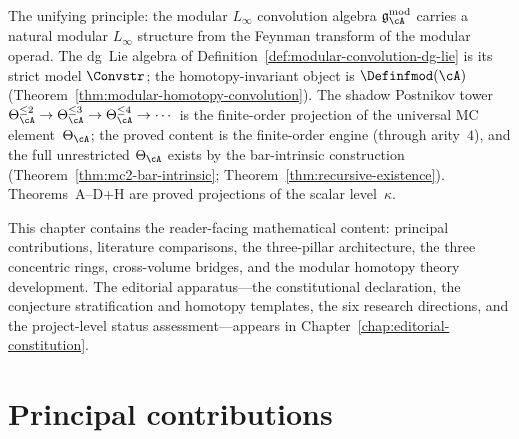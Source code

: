 \noindent
The unifying principle: the modular $L_\infty$ convolution algebra
$\mathfrak{g}^{\mathrm{mod}}_\cA$ carries a natural modular $L_\infty$
structure from the Feynman transform of the modular operad.  The dg~Lie
algebra of Definition~\ref{def:modular-convolution-dg-lie} is its strict
model $\Convstr$; the homotopy-invariant object is $\Definfmod(\cA)$
(Theorem~\ref{thm:modular-homotopy-convolution}).  The shadow Postnikov tower
$\Theta_\cA^{\le 2} \to \Theta_\cA^{\le 3} \to \Theta_\cA^{\le 4}
\to \cdots$ is the finite-order projection of the universal MC
element~$\Theta_\cA$; the proved content is the finite-order engine
(through arity~$4$), and the full unrestricted $\Theta_\cA$ exists
by the bar-intrinsic construction
(Theorem~\ref{thm:mc2-bar-intrinsic};
Theorem~\ref{thm:recursive-existence}).
Theorems~A--D+H are proved projections of the
scalar level~$\kappa$.

\begin{remark}[Scope]
This chapter contains the reader-facing mathematical content:
principal contributions, literature comparisons, the three-pillar
architecture, the three concentric rings, cross-volume bridges,
and the modular homotopy theory development.  The editorial
apparatus---the constitutional declaration, the conjecture
stratification and homotopy templates, the six research directions,
and the project-level status assessment---appears in
Chapter~\ref{chap:editorial-constitution}.
\end{remark}


\section{Principal contributions}\label{sec:principal-contributions}

